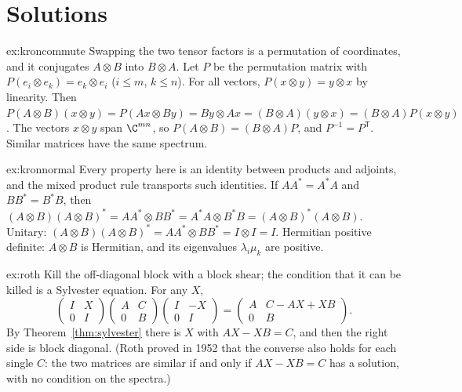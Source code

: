 \section{Solutions}

\begin{solution}{ex:kroncommute}
\idea Swapping the two tensor factors is a permutation of coordinates, and it conjugates $A\otimes B$ into $B\otimes A$.
\writeup Let $P$ be the permutation matrix with $P(e_i\otimes e_k)=e_k\otimes e_i$ ($i\le m$, $k\le n$). For all vectors,
$P(x\otimes y)=y\otimes x$ by linearity. Then $P(A\otimes B)(x\otimes y)=P(Ax\otimes By)=By\otimes Ax=(B\otimes A)(y\otimes x)=(B\otimes A)
P(x\otimes y)$. The vectors $x\otimes y$ span $\C^{mn}$, so $P(A\otimes B)=(B\otimes A)P$, and $P^{-1}=P^{\mathsf T}$. Similar matrices
have the same spectrum.
\end{solution}

\begin{solution}{ex:kronnormal}
\idea Every property here is an identity between products and adjoints, and the mixed product rule transports such identities.
\writeup If $AA^*=A^*A$ and $BB^*=B^*B$, then $(A\otimes B)(A\otimes B)^*=AA^*\otimes BB^*=A^*A\otimes B^*B=(A\otimes B)^*(A\otimes B)$.
Unitary: $(A\otimes B)(A\otimes B)^*=AA^*\otimes BB^*=I\otimes I=I$. Hermitian positive definite: $A\otimes B$ is Hermitian, and its eigenvalues
$\lambda_i\mu_k$ are positive.
\end{solution}

\begin{solution}{ex:roth}
\idea Kill the off-diagonal block with a block shear; the condition that it can be killed is a Sylvester equation.
\writeup For any $X$,
\[
\begin{pmatrix}I&X\\0&I\end{pmatrix}\begin{pmatrix}A&C\\0&B\end{pmatrix}\begin{pmatrix}I&-X\\0&I\end{pmatrix}=\begin{pmatrix}A&C-AX+XB\\0&B
\end{pmatrix}.
\]
By Theorem~\ref{thm:sylvester} there is $X$ with $AX-XB=C$, and then the right side is block diagonal. (Roth proved in 1952 that
the converse also holds for each single $C$: the two matrices are similar if and only if $AX-XB=C$ has a solution, with no
condition on the spectra.)
\end{solution}


